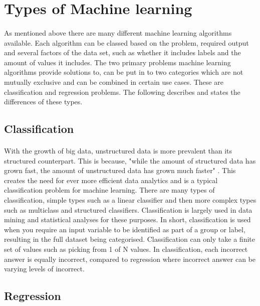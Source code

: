 \section{Types of Machine learning}
\label{sec:section4}

\paragraph{}As mentioned above there are many different machine learning algorithms available. Each algorithm can be classed based on the problem, required output and several factors of the data set, such as whether it includes labels and the amount of values it includes. The two primary problems machine learning algorithms provide solutions to, can be put in to two categories which are not mutually exclusive and can be combined in certain use cases. These are classification and regression problems. The following describes and states the differences of these types.


\subsection{Classification} 
\label{ssec:subsection1}

\paragraph{}With the growth of big data, unstructured data is more prevalent than its structured counterpart. This is because, "while the amount of structured data has grown fast, the amount of unstructured data has grown much faster" \cite{bigData}. This creates the need for ever more efficient data analytics and is a typical classification problem for machine learning. There are many types of classification, simple types such as a linear classifier and then more complex types such as multiclass and structured classifiers. Classification is largely used in data mining and statistical analyses for these purposes. In short, classification is used when you require an input variable to be identified as part of a group or label, resulting in the full dataset being categorised. Classification can only take a finite set of values such as picking from 1 of N values. In classification, each incorrect answer is equally incorrect, compared to regression where incorrect answer can be varying levels of incorrect.

\subsection{Regression} 
\label{ssec:subsection2}

